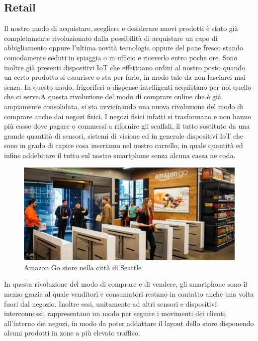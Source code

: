 \subsection{Retail}
Il nostro modo di acquistare, scegliere e desiderare nuovi prodotti è stato già completamente rivoluzionato dalla possibilità di acquistare un capo di abbigliamento oppure l'ultima novità tecnologia oppure del pane fresco stando comodamente seduti in spiaggia o in ufficio e riceverlo entro poche ore.
Sono inoltre già presenti dispositivi IoT che effettuano ordini al nostro posto quando un certo prodotto si esaurisce o sta per farlo, in modo tale da non lasciarci mai senza. In questo modo, frigoriferi o dispense intelligenti acquistano per noi quello che ci serve.A questa rivoluzione del modo di comprare online che è già ampiamente consolidata, si sta avvicinando una nuova rivoluzione del modo di comprare anche dai negozi fisici. I negozi fisici infatti si trasformano e non hanno più casse dove pagare o commessi a rifornire gli scaffali, il tutto sostituto da una grande quantità di sensori, sistemi di visione ed in generale dispositivi IoT che sono in grado di capire cosa inseriamo nel nostro carrello, in quale quantità ed infine addebitare il tutto sul nostro smartphone senza alcuna cassa ne coda.
\begin{figure}
	\begin{center}
		\includegraphics[width=0.8\columnwidth]{images/application_amazon_go}
	\end{center}
	\caption{Amazon Go store nella città di Seattle}
	\label{fig:application_amazon_go}
\end{figure}
In questa rivoluzione del modo di comprare e di vendere, gli smartphone sono il mezzo grazie al quale venditori e consumatori restano in contatto anche una volta fuori dal negozio. Inoltre essi, unitamente ad altri sensori e dispositivi interconnessi, rappresentano un modo per seguire i movimenti dei clienti all'interno dei negozi, in modo da poter addattare il layout dello store disponendo alcuni prodotti in zone a più elevato traffico.
